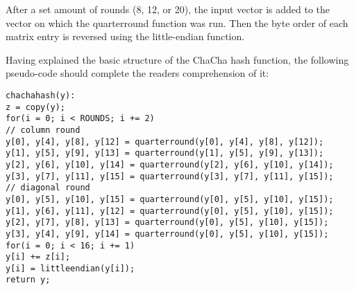 After a set amount of rounds (8, 12, or 20), the input vector is added to the vector on which the quarterround function was run. Then the byte order of each matrix entry is reversed using the little-endian function.

Having explained the basic structure of the ChaCha hash function, the following pseudo-code should complete the readers comprehension of it:

\begin{center}
\begin{minipage}{\linewidth}
\texttt{chachahash(y):} \\
\hspace*{1em}\texttt{z = copy(y);}\\
\hspace*{1em}\texttt{for(i = 0; i < ROUNDS; i += 2)}\\
\hspace*{2em}\texttt{// column round}\\
\hspace*{2em}\texttt{y[0], y[4], y[8], y[12] = quarterround(y[0], y[4], y[8], y[12]);}\\
\hspace*{2em}\texttt{y[1], y[5], y[9], y[13] = quarterround(y[1], y[5], y[9], y[13]);}\\
\hspace*{2em}\texttt{y[2], y[6], y[10], y[14] = quarterround(y[2], y[6], y[10], y[14]);}\\
\hspace*{2em}\texttt{y[3], y[7], y[11], y[15] = quarterround(y[3], y[7], y[11], y[15]);}\\
\hspace*{2em}\texttt{// diagonal round}\\
\hspace*{2em}\texttt{y[0], y[5], y[10], y[15] = quarterround(y[0], y[5], y[10], y[15]);}\\
\hspace*{2em}\texttt{y[1], y[6], y[11], y[12] = quarterround(y[0], y[5], y[10], y[15]);}\\
\hspace*{2em}\texttt{y[2], y[7], y[8], y[13] = quarterround(y[0], y[5], y[10], y[15]);}\\
\hspace*{2em}\texttt{y[3], y[4], y[9], y[14] = quarterround(y[0], y[5], y[10], y[15]);}\\
\hspace*{1em}\texttt{for(i = 0; i < 16; i += 1)}\\
\hspace*{2em}\texttt{y[i] += z[i];}\\
\hspace*{2em}\texttt{y[i] = littleendian(y[i]);}\\
\hspace*{1em}\texttt{return y;}
\end{minipage}
\end{center}

